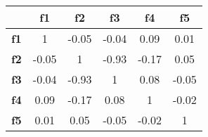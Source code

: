 \begin{tabular}{|l|c|c|c|c|c|}
\hline
&\textbf{f1}&\textbf{f2}&\textbf{f3}&\textbf{f4}&\textbf{f5}\\\hline
\textbf{f1}&1&-0.05&-0.04&0.09&0.01\\\hline
\textbf{f2}&-0.05&1&-0.93&-0.17&0.05\\\hline
\textbf{f3}&-0.04&-0.93&1&0.08&-0.05\\\hline
\textbf{f4}&0.09&-0.17&0.08&1&-0.02\\\hline
\textbf{f5}&0.01&0.05&-0.05&-0.02&1\\\hline
\end{tabular}
